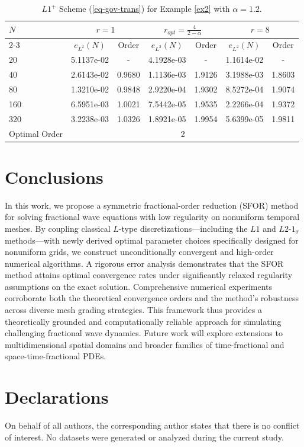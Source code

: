 \documentclass[11pt]{article}
\numberwithin{equation}{section}
\begin{document}
\begin{table}[!ht]
\caption{$L1^+$ Scheme (\ref{eq-gov-trans}) for Example \ref{ex2} with $\alpha=1.2$.}
\renewcommand{\arraystretch}{1}
\def\temptablewidth{0.95\textwidth}
\begin{center}
 \begin{tabular*}{\temptablewidth}{@{\extracolsep{\fill}}lcccccc}\hline
 $N$ &\multicolumn{2}{c}{$r=1$} &\multicolumn{2}{c}{$r_{opt}=\frac{4}{2-\alpha}$} &\multicolumn{2}{c}{$r=8$}    \\
 \cline{2-3}\cline{4-5}\cline{6-7}
 & $e_{L^{2}}(N)$         &Order     &$e_{L^{2}}(N)$    &Order    &$e_{L^{2}}(N)$ &Order     \\ \hline 
 20 &5.1137e-02     &-       &4.1928e-03   &-        &1.1614e-02  &-  \\
 40 &2.6143e-02     &0.9680  &1.1136e-03   &1.9126   &3.1988e-03  &1.8603    \\
 80 &1.3210e-02     &0.9848  &2.9220e-04   &1.9302   &8.5272e-04  &1.9074 \\
 160 &6.5951e-03    &1.0021  &7.5442e-05   &1.9535   &2.2266e-04  &1.9372    \\
 320 &3.2238e-03    &1.0326  &1.8921e-05   &1.9954   &5.6399e-05  &1.9811    \\\hline
 Optimal Order  &\multicolumn{6}{c}{2} \\ \hline
\end{tabular*}
\end{center}
\end{table}
\fi

\newpage
\section{Conclusions}
In this work, we propose a symmetric fractional-order reduction (SFOR) method for solving fractional wave equations with low regularity on nonuniform temporal meshes. By coupling classical $L$-type discretizations—including the $L1$ and $L2$-$1_\sigma$ methods—with newly derived optimal parameter choices specifically designed for nonuniform grids, we construct unconditionally convergent and high-order numerical algorithms. A rigorous error analysis demonstrates that the SFOR method attains optimal convergence rates under significantly relaxed regularity assumptions on the exact solution. Comprehensive numerical experiments corroborate both the theoretical convergence orders and the method's robustness across diverse mesh grading strategies. This framework thus provides a theoretically grounded and computationally reliable approach for simulating challenging fractional wave dynamics. Future work will explore extensions to multidimensional spatial domains and broader families of time-fractional and space-time-fractional PDEs.

\section*{Declarations}
On behalf of all authors, the corresponding author states that there is no conflict of interest. No datasets were generated or analyzed during the current study.



\end{document}

